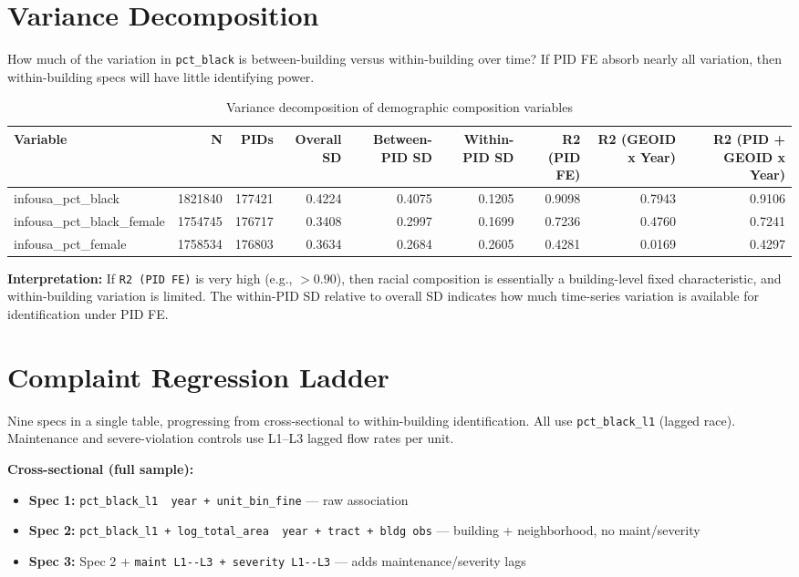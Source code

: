 \documentclass[
  10pt,
]{article}
\providecommand{\tightlist}{%
  \setlength{\itemsep}{0pt}\setlength{\parskip}{0pt}}
\begin{document}
\section{Variance Decomposition}\label{variance-decomposition}

How much of the variation in \texttt{pct\_black} is between-building
versus within-building over time? If PID FE absorb nearly all variation,
then within-building specs will have little identifying power.

\begingroup\fontsize{9}{11}\selectfont

\begin{longtable}[t]{lrrrrrrrr}
\caption{\label{tab:vardecomp-table}Variance decomposition of demographic composition variables}\\
\toprule
Variable & N & PIDs & Overall SD & Between-PID SD & Within-PID SD & R2 (PID FE) & R2 (GEOID x Year) & R2 (PID + GEOID x Year)\\
\midrule
infousa\_pct\_black & 1821840 & 177421 & 0.4224 & 0.4075 & 0.1205 & 0.9098 & 0.7943 & 0.9106\\
infousa\_pct\_black\_female & 1754745 & 176717 & 0.3408 & 0.2997 & 0.1699 & 0.7236 & 0.4760 & 0.7241\\
infousa\_pct\_female & 1758534 & 176803 & 0.3634 & 0.2684 & 0.2605 & 0.4281 & 0.0169 & 0.4297\\
\bottomrule
\end{longtable}
\endgroup{}

\textbf{Interpretation:} If \texttt{R2\ (PID\ FE)} is very high (e.g.,
\(> 0.90\)), then racial composition is essentially a building-level
fixed characteristic, and within-building variation is limited. The
within-PID SD relative to overall SD indicates how much time-series
variation is available for identification under PID FE.

\section{Complaint Regression Ladder}\label{complaint-regression-ladder}

Nine specs in a single table, progressing from cross-sectional to
within-building identification. All use \texttt{pct\_black\_l1} (lagged
race). Maintenance and severe-violation controls use L1--L3 lagged flow
rates per unit.

\textbf{Cross-sectional (full sample):}

\begin{itemize}
\tightlist
\item
  \textbf{Spec 1:}
  \texttt{pct\_black\_l1\ \textbar{}\ year\ +\ unit\_bin\_fine} --- raw
  association
\item
  \textbf{Spec 2:}
  \texttt{pct\_black\_l1\ +\ log\_total\_area\ \textbar{}\ year\ +\ tract\ +\ bldg\ obs}
  --- building + neighborhood, no maint/severity
\item
  \textbf{Spec 3:} Spec 2 +
  \texttt{maint\ L1-\/-L3\ +\ severity\ L1-\/-L3} --- adds
  maintenance/severity lags
\end{itemize}
\end{document}
